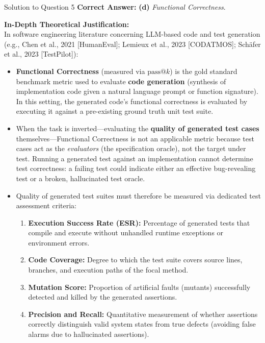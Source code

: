 \documentclass[11pt,a4paper]{article}
\begin{document}
\begin{solutionbox}{Solution to Question 5}
\textbf{Correct Answer:} \textbf{(d)} \textit{Functional Correctness}.

\medskip
\textbf{In-Depth Theoretical Justification:}\\
In software engineering literature concerning LLM-based code and test generation (e.g., Chen et al., 2021 [HumanEval]; Lemieux et al., 2023 [CODATMOS]; Schäfer et al., 2023 [TestPilot]):
\begin{itemize}
    \item \textbf{Functional Correctness} (measured via $\text{pass}@k$) is the gold standard benchmark metric used to evaluate \textbf{code generation} (synthesis of implementation code given a natural language prompt or function signature). In this setting, the generated code's functional correctness is evaluated by executing it against a pre-existing ground truth unit test suite.
    \item When the task is inverted---evaluating the \textbf{quality of generated test cases} themselves---Functional Correctness is not an applicable metric because test cases act as the \textit{evaluators} (the specification oracle), not the target under test. Running a generated test against an implementation cannot determine test correctness: a failing test could indicate either an effective bug-revealing test or a broken, hallucinated test oracle.
    \item Quality of generated test suites must therefore be measured via dedicated test assessment criteria:
    \begin{enumerate}
        \item \textbf{Execution Success Rate (ESR):} Percentage of generated tests that compile and execute without unhandled runtime exceptions or environment errors.
        \item \textbf{Code Coverage:} Degree to which the test suite covers source lines, branches, and execution paths of the focal method.
        \item \textbf{Mutation Score:} Proportion of artificial faults (mutants) successfully detected and killed by the generated assertions.
        \item \textbf{Precision and Recall:} Quantitative measurement of whether assertions correctly distinguish valid system states from true defects (avoiding false alarms due to hallucinated assertions).
    \end{enumerate}
\end{itemize}
\end{solutionbox}
\end{document}
